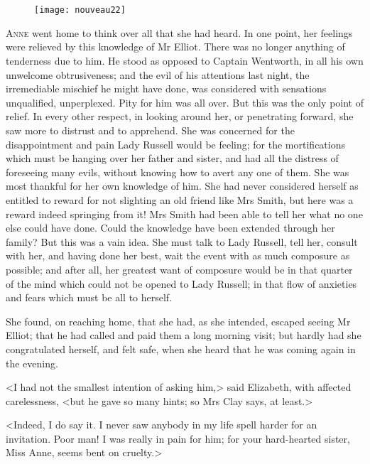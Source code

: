 \chapter[Chapter \thechapter]{}

\begin{figure}[t!]
\centering
\texttt{[image: nouveau22]}
\end{figure}

\lettrine[lraise=0.3]{A}{nne} went home to think over all that she had heard. In one point, her feelings were relieved by this knowledge of Mr Elliot. There was no longer anything of tenderness due to him. He stood as opposed to Captain Wentworth, in all his own unwelcome obtrusiveness; and the evil of his attentions last night, the irremediable mischief he might have done, was considered with sensations unqualified, unperplexed. Pity for him was all over. But this was the only point of relief. In every other respect, in looking around her, or penetrating forward, she saw more to distrust and to apprehend. She was concerned for the disappointment and pain Lady Russell would be feeling; for the mortifications which must be hanging over her father and sister, and had all the distress of foreseeing many evils, without knowing how to avert any one of them. She was most thankful for her own knowledge of him. She had never considered herself as entitled to reward for not slighting an old friend like Mrs Smith, but here was a reward indeed springing from it! Mrs Smith had been able to tell her what no one else could have done. Could the knowledge have been extended through her family? But this was a vain idea. She must talk to Lady Russell, tell her, consult with her, and having done her best, wait the event with as much composure as possible; and after all, her greatest want of composure would be in that quarter of the mind which could not be opened to Lady Russell; in that flow of anxieties and fears which must be all to herself.

She found, on reaching home, that she had, as she intended, escaped seeing Mr Elliot; that he had called and paid them a long morning visit; but hardly had she congratulated herself, and felt safe, when she heard that he was coming again in the evening.

<I had not the smallest intention of asking him,> said Elizabeth, with affected carelessness, <but he gave so many hints; so Mrs Clay says, at least.>

<Indeed, I do say it. I never saw anybody in my life spell harder for an invitation. Poor man! I was really in pain for him; for your hard-hearted sister, Miss Anne, seems bent on cruelty.>

